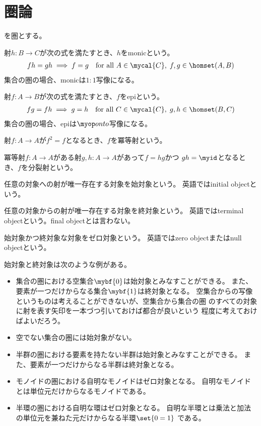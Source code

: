 \section{圏論}\label{s1:圏論} %
	を圏とする。
	\begin{description}\setlength{\itemsep}{-1mm} %
		\item[monic] 射$h:B\to C$が次の式を満たすとき、$h$をmonicという。
		\begin{equation*}\begin{split} %
			fh = gh \implies f = g 
			\quad\text{for all }A\in\mycal{C},\;f,g\in \homset(A,B)
		\end{split}\end{equation*} %
		集合の圏の場合、monicは$1:1$写像になる。
		\item[epi] 射$f:A\to B$が次の式を満たすとき、$f$をepiという。
		\begin{equation*}\begin{split} %
			fg = fh \implies g = h 
			\quad\text{for all }C\in\mycal{C},\;g,h\in \homset(B,C)
		\end{split}\end{equation*} %
		集合の圏の場合、epiは$\onto$写像になる。
		\item[冪等射] 射$f:A\to A$が$f^2=f$となるとき、$f$を冪等射という。
		\item[分裂射] 冪等射$f:A\to A$がある射$g,h:A\to A$があって$f=hg$かつ
		$gh=\myid$となるとき、$f$を分裂射という。
		\item[始対象] 任意の対象への射が唯一存在する対象を始対象という。
		英語ではinitial objectという。
		\item[終対象] 任意の対象からの射が唯一存在する対象を終対象という。
		英語ではterminal objectという。final objectとは言わない。
		\item[ゼロ対象] 始対象かつ終対象な対象をゼロ対象という。
		英語ではzero objectまたはnull objectという。 
	\end{description} %
	始対象と終対象は次のような例がある。
	\begin{itemize}\setlength{\itemsep}{-1mm} %
		\item 集合の圏における空集合$\mybf{0}$は始対象とみなすことができる。
		また、要素が一つだけからなる集合$\mybf{1}$は終対象となる。
		空集合からの写像というものは考えることができないが、空集合から集合の圏
		のすべての対象に射を表す矢印を一本づつ引いておけば都合が良いという
		程度に考えておけばよいだろう。
		\item 空でない集合の圏には始対象がない。
		\item 半群の圏における要素を持たない半群は始対象とみなすことができる。
		また、要素が一つだけからなる半群は終対象となる。
		\item モノイドの圏における自明なモノイドはゼロ対象となる。
		自明なモノイドとは単位元だけからなるモノイドである。
		\item 半環の圏における自明な環はゼロ対象となる。
		自明な半環とは乗法と加法の単位元を兼ねた元だけからなる半環$\set{0=1}$
		である。
	\end{itemize} %
